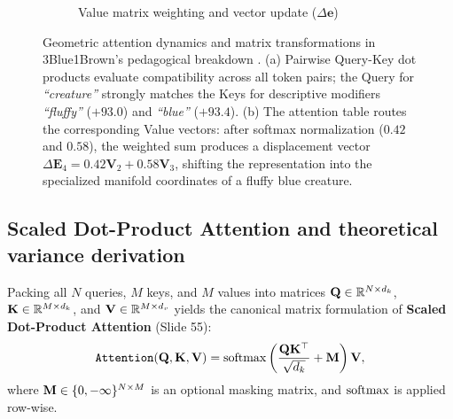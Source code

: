 \documentclass[../../main.tex]{subfiles}
\begin{document}
\begin{figure}[htbp]
\begin{subfigure}[b]{0.48\textwidth}
{%
    }
    \caption{Value matrix weighting and vector update ($\Delta \mathbf{e}$)}
    \label{fig:3b1b_value_table_ch5}
\end{subfigure}
\caption{Geometric attention dynamics and matrix transformations in 3Blue1Brown's pedagogical breakdown \cite{sanderson2024attention}. (a) Pairwise Query-Key dot products evaluate compatibility across all token pairs; the Query for \emph{``creature''} strongly matches the Keys for descriptive modifiers \emph{``fluffy''} ($+93.0$) and \emph{``blue''} ($+93.4$). (b) The attention table routes the corresponding Value vectors: after softmax normalization ($0.42$ and $0.58$), the weighted sum produces a displacement vector $\Delta \mathbf{E}_4 = 0.42 \mathbf{V}_2 + 0.58 \mathbf{V}_3$, shifting the representation into the specialized manifold coordinates of a fluffy blue creature.}
\label{fig:3b1b_query_key_creature_ch5}
\end{figure}

\subsection{Scaled Dot-Product Attention and theoretical variance derivation}
\label{subsec:scaled_dot_product_math}

Packing all $N$ queries, $M$ keys, and $M$ values into matrices $\mathbf{Q} \in \mathbb{R}^{N \times d_k}$, $\mathbf{K} \in \mathbb{R}^{M \times d_k}$, and $\mathbf{V} \in \mathbb{R}^{M \times d_v}$ yields the canonical matrix formulation of \textbf{Scaled Dot-Product Attention} \cite{vaswani2017} (Slide 55):
\begin{equation}
\label{eq:scaled_dot_product_full_matrix}
\text{\texttt{Attention}}(\mathbf{Q}, \mathbf{K}, \mathbf{V}) = \operatorname{\mathrm{softmax}}\left( \frac{\mathbf{Q} \mathbf{K}^\top}{\sqrt{d_k}} + \mathbf{M} \right) \mathbf{V},
\end{equation}
where $\mathbf{M} \in \{0, -\infty\}^{N \times M}$ is an optional masking matrix, and $\operatorname{\mathrm{softmax}}$ is applied row-wise.
\end{document}
